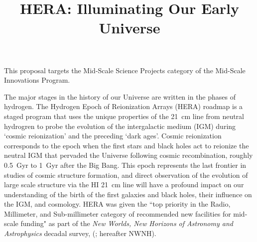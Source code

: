\documentclass[preprint]{aastex}
\begin{document}
\title{HERA: Illuminating Our Early Universe} %



\noindent
This proposal targets the Mid-Scale Science Projects category of the Mid-Scale Innovations Program.

\vspace{0.25in}

\noindent

The major stages in the history of our Universe are written in the phases of hydrogen. The Hydrogen Epoch of Reionization Arrays (HERA) roadmap is a staged program that uses the unique properties of the 21~cm line from neutral hydrogren to probe the evolution of the intergalactic medium (IGM) during `cosmic reionization' and the preceding `dark ages'. Cosmic reionization corresponds to the epoch when the first stars and black holes act to reionize the neutral IGM that pervaded the Universe following cosmic recombination, roughly 0.5~Gyr to 1~Gyr after the Big Bang. This epoch represents the last frontier in studies of cosmic structure formation, and direct observation of the evolution of large scale structure via the HI 21~cm line will have a profound impact on our understanding of the birth of the first galaxies and black holes, their influence on the IGM, and cosmology.  HERA was given the ``top priority in the Radio, Millimeter, and Sub-millimeter category of recommended new facilities for mid-scale funding" as part of the {\it New Worlds, New Horizons of Astronomy and Astrophysics} decadal survey, (\citealt{astro2010}; hereafter NWNH).  
\end{document}
